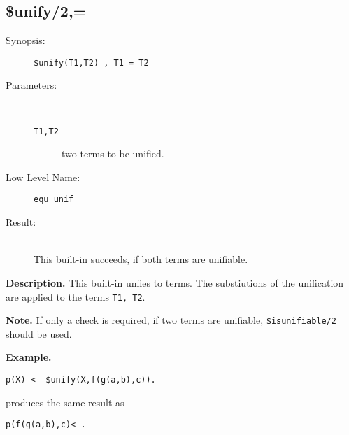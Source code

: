 %
%
%
\subsection{\$unify/2,=}

\begin{description}
\item[Synopsis:]
	{\tt \$unify(T1,T2) , T1 = T2}
\item[Parameters:]\ \\[-0.5cm]
	\begin{description}
	\item[{\tt T1,T2}]
two terms to be unified.
	\end{description}
\item[Low Level Name:]
	{\tt equ\_unif}
\item[Result:]\ \\
This built-in succeeds, if both terms are unifiable.
\end{description}

\vspace*{0.5cm}
\noindent
{\bf Description.}
This built-in unfies to terms.
The substiutions of the unification are applied to
the terms {\tt T1, T2}.
 
\vspace*{0.5cm}
\noindent
{\bf Note.}
If only a check is required, if two terms are unifiable, {\tt \$isunifiable/2}
should be used.



\vspace*{0.5cm}
\noindent
{\bf Example.}
\begin{verbatim}
p(X) <- $unify(X,f(g(a,b),c)).
\end{verbatim}
produces the same result as
\begin{verbatim}
p(f(g(a,b),c)<-.
\end{verbatim}
 

